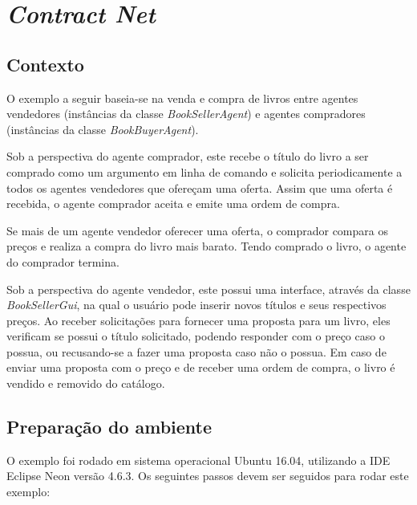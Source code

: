 
\section{\textit{Contract Net}}\label{appendix:contract_net}
\subsection{Contexto}

O exemplo a seguir baseia-se na venda e compra de livros entre agentes vendedores (instâncias da classe \textit{BookSellerAgent}) e agentes compradores (instâncias da classe \textit{BookBuyerAgent}). 

Sob a perspectiva do agente comprador, este recebe o título do livro a ser comprado como um argumento em linha de comando e solicita periodicamente a todos os agentes vendedores que ofereçam uma oferta. Assim que uma oferta é recebida, o agente comprador aceita e emite uma ordem de compra. 

Se mais de um agente vendedor oferecer uma oferta, o comprador compara os preços e realiza a compra do livro mais barato. Tendo comprado o livro, o agente do comprador termina. 

Sob a perspectiva do agente vendedor, este possui uma interface, através da classe \textit{BookSellerGui}, na qual o usuário pode inserir novos títulos e seus respectivos preços. Ao receber solicitações para fornecer uma proposta para um livro, eles verificam se possui o título solicitado, podendo responder com o preço caso o possua, ou recusando-se a fazer uma proposta caso não o possua. Em caso de enviar uma proposta com o preço e de receber uma ordem de compra, o livro é vendido e removido do catálogo.

\subsection{Preparação do ambiente}

O exemplo foi rodado em sistema operacional Ubuntu 16.04, utilizando a IDE Eclipse Neon versão 4.6.3. Os seguintes passos devem ser seguidos para rodar este exemplo:

